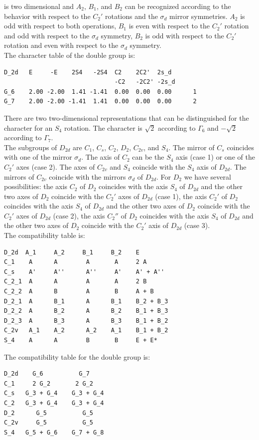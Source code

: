 \documentclass[12pt,a4paper]{article}
\begin{document}
is two dimensional and $A_2$, $B_1$, and $B_2$ can be recognized according to
the behavior with respect to the $C_2'$ rotations and the $\sigma_d$
mirror symmetries. $A_2$ is odd with respect to both operations, $B_1$ is
even with respect to the $C_2'$ rotation and odd with respect to the
$\sigma_d$ symmetry, $B_2$ is odd with respect to the $C_2'$ rotation and 
even with respect to the $\sigma_d$ symmetry. \\
The character table of the double group is:
\begin{verbatim}
D_2d   E     -E    2S4   -2S4  C2    2C2'  2s_d 
                               -C2   -2C2' -2s_d
G_6    2.00 -2.00  1.41 -1.41  0.00  0.00  0.00      1
G_7    2.00 -2.00 -1.41  1.41  0.00  0.00  0.00      2
\end{verbatim}
There are two two-dimensional representations that can be distinguished
for the character for an $S_4$ rotation. The character is $\sqrt{2}$
according to $\Gamma_6$ and $-\sqrt{2}$ according to $\Gamma_7$. \\
The subgroups of $D_{2d}$ are $C_1$, $C_s$, $C_2$, $D_2$, $C_{2v}$, 
and $S_4$. The mirror of $C_s$ coincides with one of the mirror $\sigma_d$. 
The axis of $C_2$ can be the $S_4$ axis (case 1) or one of the 
$C_2'$ axes (case 2). The axes of $C_{2v}$ and $S_4$
coincide with the $S_4$ axis of $D_{2d}$. The mirrors of $C_{2v}$
coincide with the mirrors $\sigma_d$ of $D_{2d}$. For $D_2$ we have several 
possibilities: the axis $C_2$ of $D_2$ coincides with the axis $S_4$
of $D_{2d}$ and the other two axes of $D_2$ coincide with the $C_2'$ axes
of $D_{2d}$ (case 1), the axis $C_2'$ of $D_2$ coincides with the axis $S_4$
of $D_{2d}$ and the other two axes of $D_2$ coincide with the $C_2'$ axes
of $D_{2d}$ (case 2), the axis $C_2''$ of $D_2$ coincides with the axis 
$S_4$ of $D_{2d}$ and the other two axes of $D_2$ coincide with the $C_2'$ 
axis of $D_{2d}$ (case 3). \\
The compatibility table is:
\begin{verbatim}
D_2d  A_1     A_2     B_1     B_2    E
C_1    A      A        A       A     2 A 
C_s    A'     A''      A''     A'    A' + A''  
C_2_1  A      A        A       A     2 B
C_2_2  A      B        A       B     A + B
D_2_1  A      B_1      A      B_1    B_2 + B_3
D_2_2  A      B_2      A      B_2    B_1 + B_3
D_2_3  A      B_3      A      B_3    B_1 + B_2
C_2v   A_1    A_2      A_2    A_1    B_1 + B_2
S_4    A      A        B       B     E + E*
\end{verbatim}
The compatibility table for the double group is:
\begin{verbatim}
D_2d    G_6          G_7  
C_1     2 G_2       2 G_2 
C_s   G_3 + G_4    G_3 + G_4
C_2   G_3 + G_4    G_3 + G_4
D_2      G_5          G_5
C_2v     G_5          G_5
S_4   G_5 + G_6    G_7 + G_8
\end{verbatim}
\end{document}
